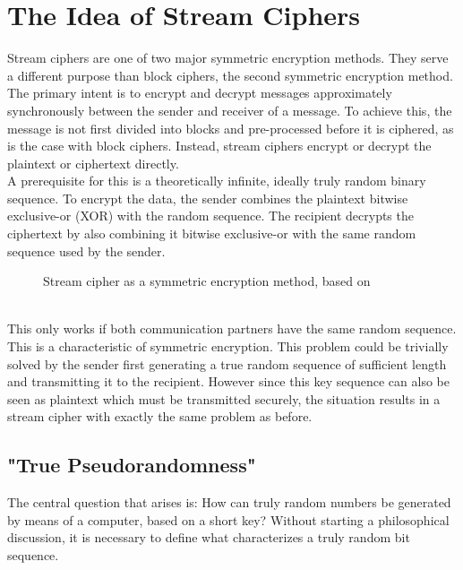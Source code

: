 \section{The Idea of Stream Ciphers}

Stream ciphers are one of two major symmetric encryption methods. They serve a different purpose than block ciphers, the second symmetric encryption method. The primary intent is to encrypt and decrypt messages approximately synchronously between the sender and receiver of a message. To achieve this, the message is not first divided into blocks and pre-processed before it is ciphered, as is the case with block ciphers. Instead, stream ciphers encrypt or decrypt the plaintext or ciphertext directly. \cite[p. 223]{Schneier.2006} \\

A prerequisite for this is a theoretically infinite, ideally truly random binary sequence. To encrypt the data, the sender combines the plaintext bitwise exclusive-or (XOR) with the random sequence. The recipient decrypts the ciphertext by also combining it bitwise exclusive-or with the same random sequence used by the sender.
\begin{figure}[h]
	\centering
	
	\caption{Stream cipher as a symmetric encryption method, based on \cite[p. 232]{Schneier.2006}}
	\label{fig:Figure_1}
\end{figure}
\\ This only works if both communication partners have the same random sequence. This is a characteristic of symmetric encryption. \cite[pp. 319-320]{Schmeh.2016} This problem could be trivially solved by the sender first generating a true random sequence of sufficient length and transmitting it to the recipient. However since this key sequence can also be seen as plaintext which must be transmitted securely, the situation results in a stream cipher with exactly the same problem as before.
\subsection{"True Pseudorandomness"}
The central question that arises is: How can truly random numbers be generated by means of a computer, based on a short key? \cite[p. 53]{Beutelspacher.2005} Without starting a philosophical discussion, it is necessary to define what characterizes a truly random bit sequence. \\

